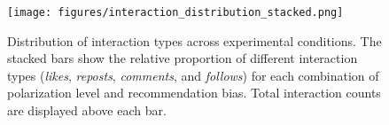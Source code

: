 \begin{figure}[h!]
    \centering
    \texttt{[image: figures/interaction\_distribution\_stacked.png]}
    \caption{Distribution of interaction types across experimental conditions. The stacked bars show the relative proportion of different interaction types (\emph{likes}, \emph{reposts}, \emph{comments}, and \emph{follows}) for each combination of polarization level and recommendation bias. Total interaction counts are displayed above each bar.}
    \label{fig:stacked-interaction-distribution}
\end{figure}
